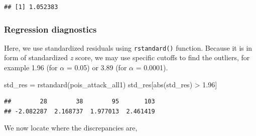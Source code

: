\documentclass[
  10pt,
]{krantz}
\newenvironment{Shaded}{\begin{snugshade}}{\end{snugshade}}
\newcommand{\AttributeTok}[1]{\textcolor[rgb]{0.77,0.63,0.00}{#1}}
\newcommand{\FloatTok}[1]{\textcolor[rgb]{0.00,0.00,0.81}{#1}}
\newcommand{\FunctionTok}[1]{\textcolor[rgb]{0.00,0.00,0.00}{#1}}
\newcommand{\NormalTok}[1]{#1}
\newcommand{\OtherTok}[1]{\textcolor[rgb]{0.56,0.35,0.01}{#1}}
\newcommand{\SpecialCharTok}[1]{\textcolor[rgb]{0.00,0.00,0.00}{#1}}
\newcommand{\StringTok}[1]{\textcolor[rgb]{0.31,0.60,0.02}{#1}}
\begin{document}
\begin{Shaded}
\end{Shaded}

\begin{verbatim}
## [1] 1.052383
\end{verbatim}

\hypertarget{regression-diagnostics}{%
\subsubsection*{\texorpdfstring{Regression diagnostics}{Regression diagnostics}}\label{regression-diagnostics}}


Here, we use standardized residuals using \texttt{rstandard()} function. Because it is in form of standardized \emph{z} score, we may use specific cutoffs to find the outliers, for example 1.96 (for \(\alpha\) = 0.05) or 3.89 (for \(\alpha\) = 0.0001).

\begin{Shaded}
\begin{Highlighting}[]
\NormalTok{std\_res }\OtherTok{=} \FunctionTok{rstandard}\NormalTok{(pois\_attack\_all1)}
\NormalTok{std\_res[}\FunctionTok{abs}\NormalTok{(std\_res) }\SpecialCharTok{\textgreater{}} \FloatTok{1.96}\NormalTok{]}
\end{Highlighting}
\end{Shaded}

\begin{verbatim}
##        28        38        95       103 
## -2.082287  2.168737  1.977013  2.461419
\end{verbatim}

We now locate where the discrepancies are,

\begin{Shaded}
\end{Shaded}
\end{document}
